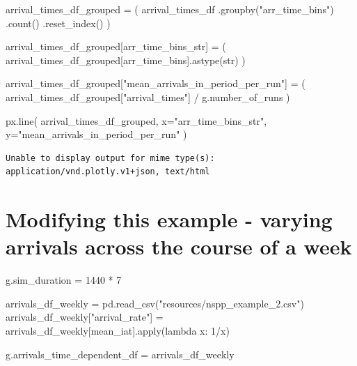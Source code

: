 \documentclass[
  letterpaper,
  DIV=11,
  numbers=noendperiod]{scrreprt}
\newenvironment{Shaded}{\begin{snugshade}}{\end{snugshade}}
\newcommand{\BuiltInTok}[1]{\textcolor[rgb]{0.00,0.23,0.31}{#1}}
\newcommand{\DecValTok}[1]{\textcolor[rgb]{0.68,0.00,0.00}{#1}}
\newcommand{\KeywordTok}[1]{\textcolor[rgb]{0.00,0.23,0.31}{#1}}
\newcommand{\NormalTok}[1]{\textcolor[rgb]{0.00,0.23,0.31}{#1}}
\newcommand{\OperatorTok}[1]{\textcolor[rgb]{0.37,0.37,0.37}{#1}}
\newcommand{\StringTok}[1]{\textcolor[rgb]{0.13,0.47,0.30}{#1}}
\begin{document}
\begin{Shaded}
\begin{Highlighting}[]
\NormalTok{arrival\_times\_df\_grouped }\OperatorTok{=}\NormalTok{ (}
\NormalTok{  arrival\_times\_df}
\NormalTok{  .groupby(}\StringTok{"arr\_time\_bins"}\NormalTok{)}
\NormalTok{  .count()}
\NormalTok{  .reset\_index()}
\NormalTok{)}
\end{Highlighting}
\end{Shaded}

\begin{Shaded}
\begin{Highlighting}[]
\NormalTok{arrival\_times\_df\_grouped[}\StringTok{\textquotesingle{}arr\_time\_bins\_str\textquotesingle{}}\NormalTok{] }\OperatorTok{=}\NormalTok{ (}
\NormalTok{  arrival\_times\_df\_grouped[}\StringTok{\textquotesingle{}arr\_time\_bins\textquotesingle{}}\NormalTok{].astype(}\StringTok{\textquotesingle{}str\textquotesingle{}}\NormalTok{)}
\NormalTok{)}

\NormalTok{arrival\_times\_df\_grouped[}\StringTok{"mean\_arrivals\_in\_period\_per\_run"}\NormalTok{] }\OperatorTok{=}\NormalTok{ (}
\NormalTok{  arrival\_times\_df\_grouped[}\StringTok{"arrival\_times"}\NormalTok{] }\OperatorTok{/}\NormalTok{ g.number\_of\_runs}
\NormalTok{)}

\NormalTok{px.line(}
\NormalTok{  arrival\_times\_df\_grouped,}
\NormalTok{  x}\OperatorTok{=}\StringTok{"arr\_time\_bins\_str"}\NormalTok{,}
\NormalTok{  y}\OperatorTok{=}\StringTok{"mean\_arrivals\_in\_period\_per\_run"}
\NormalTok{)}
\end{Highlighting}
\end{Shaded}

\begin{verbatim}
Unable to display output for mime type(s): application/vnd.plotly.v1+json, text/html
\end{verbatim}

\section{Modifying this example - varying arrivals across the course of
a
week}\label{modifying-this-example---varying-arrivals-across-the-course-of-a-week}

\begin{Shaded}
\begin{Highlighting}[]
\NormalTok{g.sim\_duration }\OperatorTok{=} \DecValTok{1440} \OperatorTok{*} \DecValTok{7}

\NormalTok{arrivals\_df\_weekly }\OperatorTok{=}\NormalTok{ pd.read\_csv(}\StringTok{"resources/nspp\_example\_2.csv"}\NormalTok{)}
\NormalTok{arrivals\_df\_weekly[}\StringTok{"arrival\_rate"}\NormalTok{] }\OperatorTok{=}\NormalTok{ arrivals\_df\_weekly[}\StringTok{\textquotesingle{}mean\_iat\textquotesingle{}}\NormalTok{].}\BuiltInTok{apply}\NormalTok{(}\KeywordTok{lambda}\NormalTok{ x: }\DecValTok{1}\OperatorTok{/}\NormalTok{x)}

\NormalTok{g.arrivals\_time\_dependent\_df }\OperatorTok{=}\NormalTok{ arrivals\_df\_weekly}
\end{Highlighting}
\end{Shaded}
\end{document}
